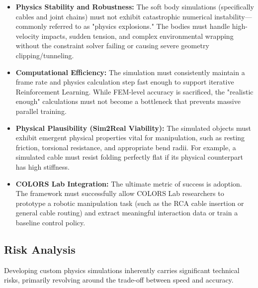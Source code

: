 \documentclass[a4paper,12pt]{report}
\begin{document}
\begin{itemize}
    \item \textbf{Physics Stability and Robustness:} The soft body simulations (specifically cables and joint chains) must not exhibit catastrophic numerical instability—commonly referred to as "physics explosions." The bodies must handle high-velocity impacts, sudden tension, and complex environmental wrapping without the constraint solver failing or causing severe geometry clipping/tunneling.
    \item \textbf{Computational Efficiency:} The simulation must consistently maintain a frame rate and physics calculation step fast enough to support iterative Reinforcement Learning. While FEM-level accuracy is sacrificed, the "realistic enough" calculations must not become a bottleneck that prevents massive parallel training.
    \item \textbf{Physical Plausibility (Sim2Real Viability):} The simulated objects must exhibit emergent physical properties vital for manipulation, such as resting friction, torsional resistance, and appropriate bend radii. For example, a simulated cable must resist folding perfectly flat if its physical counterpart has high stiffness.
    \item \textbf{COLORS Lab Integration:} The ultimate metric of success is adoption. The framework must successfully allow COLORS Lab researchers to prototype a robotic manipulation task (such as the RCA cable insertion or general cable routing) and extract meaningful interaction data or train a baseline control policy. 
\end{itemize}

\subsection{Risk Analysis}
Developing custom physics simulations inherently carries significant technical risks, primarily revolving around the trade-off between speed and accuracy.
\end{document}
